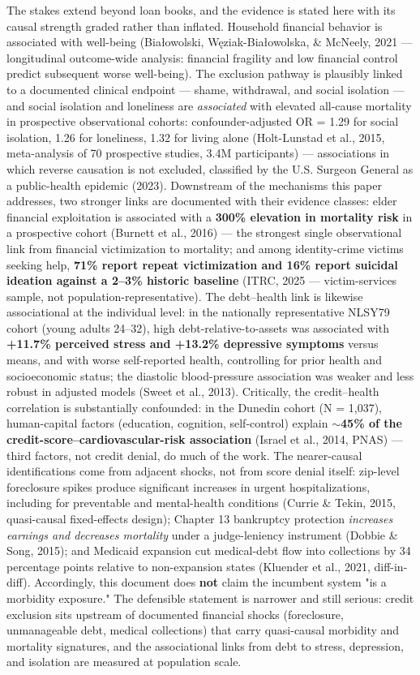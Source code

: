 \documentclass[11pt,twocolumn]{article}
\begin{document}
The stakes extend beyond loan books, and the evidence is stated here with its causal strength graded rather than inflated. Household financial behavior is associated with well-being (Bia\l{}owolski, W\k{e}ziak-Bia\l{}owolska, \& McNeely, 2021 --- longitudinal outcome-wide analysis: financial fragility and low financial control predict subsequent worse well-being). The exclusion pathway is plausibly linked to a documented clinical endpoint --- shame, withdrawal, and social isolation --- and social isolation and loneliness are \emph{associated} with elevated all-cause mortality in prospective observational cohorts: confounder-adjusted OR = 1.29 for social isolation, 1.26 for loneliness, 1.32 for living alone (Holt-Lunstad et al., 2015, meta-analysis of 70 prospective studies, 3.4M participants) --- associations in which reverse causation is not excluded, classified by the U.S. Surgeon General as a public-health epidemic (2023). Downstream of the mechanisms this paper addresses, two stronger links are documented with their evidence classes: elder financial exploitation is associated with a \textbf{300\% elevation in mortality risk} in a prospective cohort (Burnett et al., 2016) --- the strongest single observational link from financial victimization to mortality; and among identity-crime victims seeking help, \textbf{71\% report repeat victimization and 16\% report suicidal ideation against a 2--3\% historic baseline} (ITRC, 2025 --- victim-services sample, not population-representative). The debt--health link is likewise associational at the individual level: in the nationally representative NLSY79 cohort (young adults 24--32), high debt-relative-to-assets was associated with \textbf{+11.7\% perceived stress and +13.2\% depressive symptoms} versus means, and with worse self-reported health, controlling for prior health and socioeconomic status; the diastolic blood-pressure association was weaker and less robust in adjusted models (Sweet et al., 2013). Critically, the credit--health correlation is substantially confounded: in the Dunedin cohort (N = 1,037), human-capital factors (education, cognition, self-control) explain \textbf{$\sim$45\% of the credit-score--cardiovascular-risk association} (Israel et al., 2014, PNAS) --- third factors, not credit denial, do much of the work. The nearer-causal identifications come from adjacent shocks, not from score denial itself: zip-level foreclosure spikes produce significant increases in urgent hospitalizations, including for preventable and mental-health conditions (Currie \& Tekin, 2015, quasi-causal fixed-effects design); Chapter 13 bankruptcy protection \emph{increases earnings and decreases mortality} under a judge-leniency instrument (Dobbie \& Song, 2015); and Medicaid expansion cut medical-debt flow into collections by 34 percentage points relative to non-expansion states (Kluender et al., 2021, diff-in-diff). Accordingly, this document does \textbf{not} claim the incumbent system "is a morbidity exposure." The defensible statement is narrower and still serious: credit exclusion sits upstream of documented financial shocks (foreclosure, unmanageable debt, medical collections) that carry quasi-causal morbidity and mortality signatures, and the associational links from debt to stress, depression, and isolation are measured at population scale.
\end{document}
